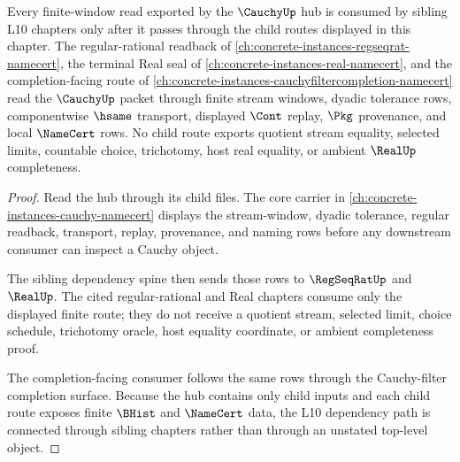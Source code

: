 \begin{theorem}
\label{thm:cauchy-l10-child-dependency-route}
Every finite-window read exported by the $\CauchyUp$ hub is consumed by sibling L10 chapters only after it passes through the child routes displayed in this chapter. The regular-rational readback of \autoref{ch:concrete-instances-regseqrat-namecert}, the terminal Real seal of \autoref{ch:concrete-instances-real-namecert}, and the completion-facing route of \autoref{ch:concrete-instances-cauchyfiltercompletion-namecert} read the $\CauchyUp$ packet through finite stream windows, dyadic tolerance rows, componentwise $\hsame$ transport, displayed $\Cont$ replay, $\Pkg$ provenance, and local $\NameCert$ rows. No child route exports quotient stream equality, selected limits, countable choice, trichotomy, host real equality, or ambient $\RealUp$ completeness.
\end{theorem}
\begin{proof}
Read the hub through its child files. The core carrier in \autoref{ch:concrete-instances-cauchy-namecert} displays the stream-window, dyadic tolerance, regular readback, transport, replay, provenance, and naming rows before any downstream consumer can inspect a Cauchy object.

The sibling dependency spine then sends those rows to $\RegSeqRatUp$ and $\RealUp$. The cited regular-rational and Real chapters consume only the displayed finite route; they do not receive a quotient stream, selected limit, choice schedule, trichotomy oracle, host equality coordinate, or ambient completeness proof.

The completion-facing consumer follows the same rows through the Cauchy-filter completion surface. Because the hub contains only child inputs and each child route exposes finite $\BHist$ and $\NameCert$ data, the L10 dependency path is connected through sibling chapters rather than through an unstated top-level object.
\end{proof}

